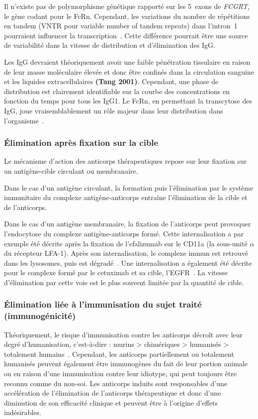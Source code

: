 Il n'existe pas de polymorphisme génétique rapporté sur les 5~exons de \textit{FCGRT}, le gène codant pour le FcRn. Cependant, les variations du nombre de répétitions en tandem (VNTR pour variable number of tandem repeats) dans l'intron~1 pourraient influencer la transcription~\citep{REF40}. Cette différence pourrait être une source de variabilité dans la vitesse de distribution et d'élimination des IgG.

Les IgG devraient théoriquement avoir une faible pénétration tissulaire en raison de leur masse moléculaire élevée et donc être confinés dans la circulation sanguine et les liquides extracellulaires \textbf{(Tang 2001)}. Cependant, une phase de distribution est clairement identifiable sur la courbe des concentrations en fonction du temps pour tous les IgG1. Le FcRn, en permettant la transcytose des IgG, joue vraisemblablement un rôle majeur dans leur distribution dans l'organisme~\citep{REF31, REF41}.

\subsubsection{Élimination après fixation sur la cible}
Le mécanisme d'action des anticorps thérapeutiques repose sur leur fixation sur un antigène-cible circulant ou membranaire. 

Dans le cas d'un antigène circulant, la formation puis l'élimination par le système immunitaire du complexe antigène-anticorps entraîne l'élimination de la cible et de l'anticorps. 

Dans le cas d'un antigène membranaire, la fixation de l'anticorps peut provoquer l'endocytose du complexe antigène-anticorps formé. Cette internalisation a par exemple été décrite après la fixation de l'efalizumab sur le CD11a (la sous-unité $\alpha$ du récepteur LFA-1). Après son internalisation, le complexe immun est retrouvé dans les lysosomes, puis est dégradé~\citep{REF42}. Une internalisation a également été décrite pour le complexe formé par le cetuximab et sa cible, l'EGFR~\citep{REF43}. La vitesse d'élimination par cette voie est le plus souvent limitée par la quantité de cible.

\subsubsection{Élimination liée à l'immunisation du sujet traité (immunogénicité)}
Théoriquement, le risque d'immunisation contre les anticorps décroît avec leur degré d'humanisation, c'est-à-dire : murins > chimériques > humanisés > totalement humains~\citep{REF44}. Cependant, les anticorps partiellement ou totalement humanisés peuvent également être immunogènes du fait de leur portion animale ou en raison d'une immunisation contre leur idiotype, qui peut toujours être reconnu comme du non-soi. Les anticorps induits sont responsables d'une accélération de l'élimination de l'anticorps thérapeutique et donc d'une diminution de son efficacité clinique et peuvent être à l'origine d'effets indésirables.

